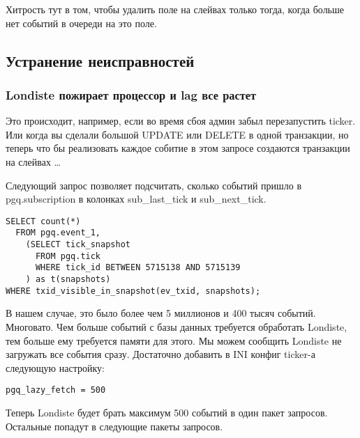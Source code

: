 Хитрость тут в том, чтобы удалить поле на слейвах только тогда, когда больше нет событий в очереди на это поле.


\subsection{Устранение неисправностей}

\subsubsection{Londiste пожирает процессор и lag все растет}
Это происходит, например, если во время сбоя админ забыл перезапустить ticker. Или когда вы сделали большой 
UPDATE или DELETE в одной транзакции, но теперь что бы реализовать каждое собитие в этом запросе создаются 
транзакции на слейвах \dots

Следующий запрос позволяет подсчитать, сколько событий пришло в pgq.subscription в колонках sub\_last\_tick и sub\_next\_tick.
\begin{verbatim}
SELECT count(*)
  FROM pgq.event_1,
    (SELECT tick_snapshot
      FROM pgq.tick
      WHERE tick_id BETWEEN 5715138 AND 5715139
    ) as t(snapshots)
WHERE txid_visible_in_snapshot(ev_txid, snapshots);
\end{verbatim}

В нашем случае, это было более чем 5 миллионов и 400 тысяч событий. Многовато. Чем больше событий 
с базы данных требуется обработать Londiste, тем больше ему требуется памяти для этого. Мы можем сообщить 
Londiste не загружать все события сразу. Достаточно добавить в INI конфиг ticker-а следующую настройку:
\begin{verbatim}
pgq_lazy_fetch = 500
\end{verbatim}
 
Теперь Londiste будет брать максимум 500 событий в один пакет запросов. Остальные попадут в следующие пакеты запросов.